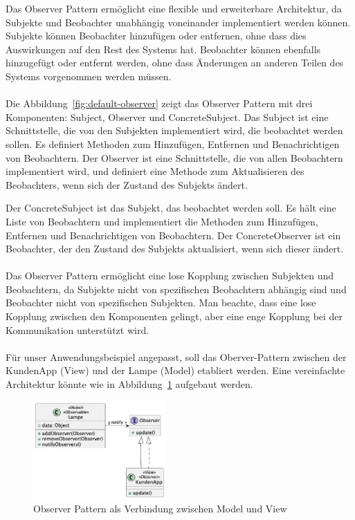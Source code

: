 \documentclass[../vs-script-first-v01.tex]{subfiles}
\begin{document}
Das Observer Pattern ermöglicht eine flexible und erweiterbare Architektur, da Subjekte und Beobachter unabhängig voneinander implementiert werden können. Subjekte können Beobachter hinzufügen oder entfernen, ohne dass dies Auswirkungen auf den Rest des Systems hat. Beobachter können ebenfalls hinzugefügt oder entfernt werden, ohne dass Änderungen an anderen Teilen des Systems vorgenommen werden müssen.
\\\\
Die Abbildung~\ref{fig:default-observer} zeigt das Observer Pattern mit drei Komponenten: Subject, Observer und ConcreteSubject. Das Subject ist eine Schnittstelle, die von den Subjekten implementiert wird, die beobachtet werden sollen. Es definiert Methoden zum Hinzufügen, Entfernen und Benachrichtigen von Beobachtern. Der Observer ist eine Schnittstelle, die von allen Beobachtern implementiert wird, und definiert eine Methode zum Aktualisieren des Beobachters, wenn sich der Zustand des Subjekts ändert.

Der ConcreteSubject ist das Subjekt, das beobachtet werden soll. Es hält eine Liste von Beobachtern und implementiert die Methoden zum Hinzufügen, Entfernen und Benachrichtigen von Beobachtern. Der ConcreteObserver ist ein Beobachter, der den Zustand des Subjekts aktualisiert, wenn sich dieser ändert.
\\\\
Das Observer Pattern ermöglicht eine lose Kopplung zwischen Subjekten und Beobachtern, da Subjekte nicht von spezifischen Beobachtern abhängig sind und Beobachter nicht von spezifischen Subjekten. Man beachte, dass eine lose Kopplung zwischen den Komponenten gelingt, aber eine enge Kopplung bei der Kommunikation unterstützt wird. 
\\\\
Für unser Anwendungsbeispiel angepasst, soll das Oberver-Pattern zwischen der KundenApp (View) und der Lampe (Model) etabliert werden. Eine vereinfachte Architektur könnte wie in Abbildung~\ref{fig:mvc-observer} aufgebaut werden. 

\begin{figure}[ht]
  \centering
  \includegraphics[width=0.45\textwidth]{fig/uml/mvc-observer.png}
  \caption{Observer Pattern als Verbindung zwischen Model und View}
  \label{fig:mvc-observer}
\end{figure}
\end{document}
